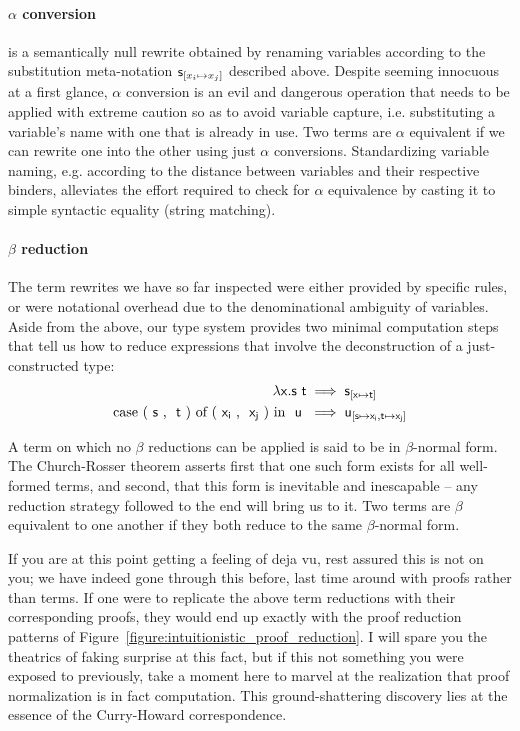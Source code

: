 \paragraph{$\alpha$ conversion} is a semantically null rewrite obtained by renaming variables according to the substitution meta-notation $\mathsf{s}_{[x_i \mapsto x_j]}$ described above. 
Despite seeming innocuous at a first glance, $\alpha$ conversion is an evil and dangerous operation that needs to be applied with extreme caution so as to avoid variable capture, i.e. substituting a variable's name with one that is already in use.  
Two terms are $\alpha$ equivalent if we can rewrite one into the other using just $\alpha$ conversions.
Standardizing variable naming, e.g. according to the distance between variables and their respective binders, alleviates the effort required to check for $\alpha$ equivalence by casting it to simple syntactic equality (string matching).

\paragraph{$\beta$ reduction}
The term rewrites we have so far inspected were either provided by specific rules, or were notational overhead due to the denominational ambiguity of variables.
Aside from the above, our type system provides two minimal computation steps that tell us how to reduce expressions that involve the deconstruction of a just-constructed type:
\begin{align*}
\term{\lambda x.s}~\term{t} & \implies \term{s}_{[\term{x} \mapsto \term{t}]}\\
\cterm{case (\term{s}, \term{t}) of (\term{x_i}, \term{x_j}) in \term{u}} & \implies \term{u_{[\term{s} \mapsto \term{x_i}, \term{t} \mapsto \term{x_j}]}}
\end{align*}

A term on which no $\beta$ reductions can be applied is said to be in $\beta$-normal form.
The Church-Rosser theorem asserts first that one such form exists for all well-formed terms, and second, that this form is inevitable and inescapable -- any reduction strategy followed to the end will bring us to it.
Two terms are $\beta$ equivalent to one another if they both reduce to the same $\beta$-normal form.

If you are at this point getting a feeling of deja vu, rest assured this is not on you; we have indeed gone through this before, last time around with proofs rather than terms.
If one were to replicate the above term reductions with their corresponding proofs, they would end up exactly with the proof reduction patterns of Figure~\ref{figure:intuitionistic_proof_reduction}.
I will spare you the theatrics of faking surprise at this fact, but if this not something you were exposed to previously, take a moment here to marvel at the realization that proof normalization is in fact computation.
This ground-shattering discovery lies at the essence of the Curry-Howard correspondence.


